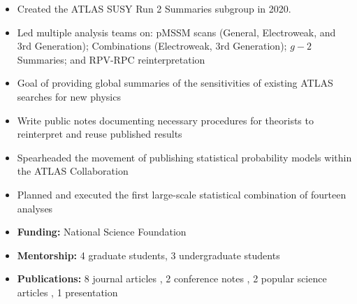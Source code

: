 \begin{itemize}
	\setlength{\itemsep}{0em}
	\item Created the ATLAS SUSY Run 2 Summaries subgroup in 2020.
	\item Led multiple analysis teams on: pMSSM scans (General, Electroweak, and 3rd Generation); Combinations (Electroweak, 3rd Generation); $g-2$ Summaries; and RPV-RPC reinterpretation
	\item Goal of providing global summaries of the sensitivities of existing ATLAS searches for new physics
	\item Write public notes documenting necessary procedures for theorists to reinterpret and reuse published results
	\item Spearheaded the movement of publishing statistical probability models within the ATLAS Collaboration
	\item Planned and executed the first large-scale statistical combination of fourteen analyses
	\item \textbf{Funding:} National Science Foundation
	\item \textbf{Mentorship:} 4 graduate students, 3 undergraduate students
	\item \textbf{Publications:} 8 journal articles , 2 conference notes , 2 popular science articles , 1 presentation 
\end{itemize}


